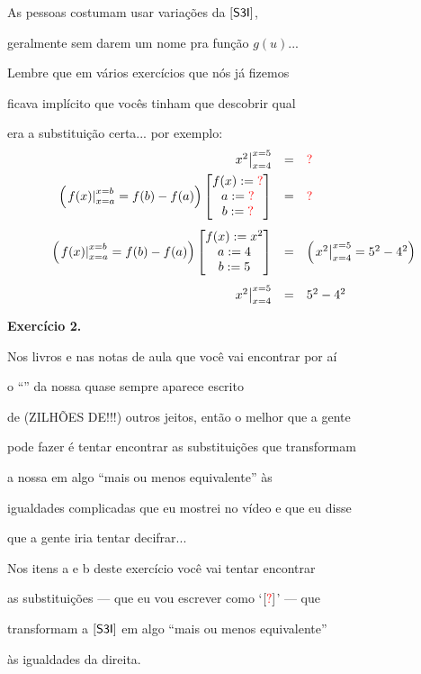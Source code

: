 \documentclass[oneside,12pt]{article}
\begin{document}
\newpage

As pessoas costumam usar variações da $\mathsf{[S3I]}$,

geralmente sem darem um nome pra função $g(u)$...


Lembre que em vários exercícios que nós já fizemos

ficava implícito que vocês tinham que descobrir qual

era a substituição certa... por exemplo:
%
$$\begin{array}{rcl}
  \difx{4}{5}{x^2} &=& \Rdq \\[5pt]
  \Ps{\difx{a}{b}{f(x)} = f(b)-f(a)} \bmat{f(x):=\Rdq \\ a:=\Rdq \\ b:=\Rdq} &=& \Rdq
  \\[20pt]
  \Ps{\difx{a}{b}{f(x)} = f(b)-f(a)} \bmat{f(x):=x^2  \\ a:=4    \\ b:=5} &=&
  \Ps{\difx{4}{5}{x^2} = 5^2-4^2} \\
  [20pt]
  \difx{4}{5}{x^2} &=& 5^2 - 4^2 \\
  \end{array}
$$


\newpage


{\bf Exercício 2.}

Nos livros e nas notas de aula que você vai encontrar por aí

o ``'' da nossa  quase sempre aparece escrito

de (ZILHÕES DE!!!) outros jeitos, então o melhor que a gente

pode fazer é tentar encontrar as substituições que transformam

a nossa  em algo ``mais ou menos equivalente'' às

igualdades complicadas que eu mostrei no vídeo e que eu disse

que a gente iria tentar decifrar...

\msk

Nos itens a e b deste exercício você vai tentar encontrar

as substituições --- que eu vou escrever como `$[\Rdq]$' --- que

transformam a $\mathsf{[S3I]}$ em algo ``mais ou menos equivalente''

às igualdades da direita.
\end{document}
